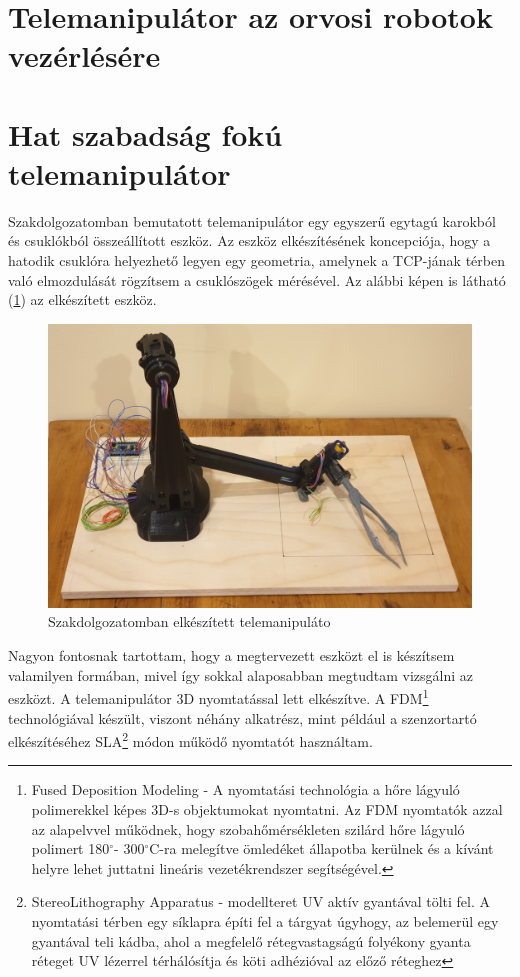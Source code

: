 \section{Telemanipulátor az orvosi robotok vezérlésére}
\section{Hat szabadság fokú telemanipulátor}
Szakdolgozatomban bemutatott telemanipulátor egy egyszerű egytagú karokból és csuklókból összeállított eszköz. Az eszköz elkészítésének koncepciója, hogy a hatodik csuklóra helyezhető legyen egy geometria, amelynek a TCP-jának térben való elmozdulását rögzítsem a csuklószögek mérésével. Az alábbi képen is látható (\ref{fig:Szakdoga_csipeszes}) az elkészített eszköz.

\begin{figure}[!ht]
\centering
\includegraphics[width=150mm, keepaspectratio]{figures/Szakdoga/0_v_4_csipeszes}
\caption{Szakdolgozatomban elkészített telemanipuláto}
\label{fig:Szakdoga_csipeszes}
\end{figure}

Nagyon fontosnak tartottam, hogy a megtervezett eszközt el is készítsem valamilyen formában, mivel így sokkal alaposabban megtudtam vizsgálni az eszközt. A telemanipulátor 3D nyomtatással lett elkészítve. A FDM\footnote{Fused Deposition Modeling - A nyomtatási technológia a hőre lágyuló polimerekkel képes 3D-s objektumokat nyomtatni. Az FDM nyomtatók azzal az alapelvvel működnek, hogy szobahőmérsékleten szilárd hőre lágyuló polimert 180$^{\circ}$- 300$^{\circ}$C-ra melegítve ömledéket állapotba kerülnek és a kívánt helyre lehet juttatni lineáris vezetékrendszer segítségével.} technológiával készült, viszont néhány alkatrész, mint például a szenzortartó elkészítéséhez SLA\footnote{StereoLithography Apparatus - modellteret UV aktív gyantával tölti fel. A nyomtatási térben egy síklapra építi fel a tárgyat úgyhogy, az belemerül egy gyantával teli kádba, ahol a megfelelő rétegvastagságú folyékony gyanta réteget UV lézerrel térhálósítja és köti adhézióval az előző réteghez} módon működő nyomtatót használtam. 

